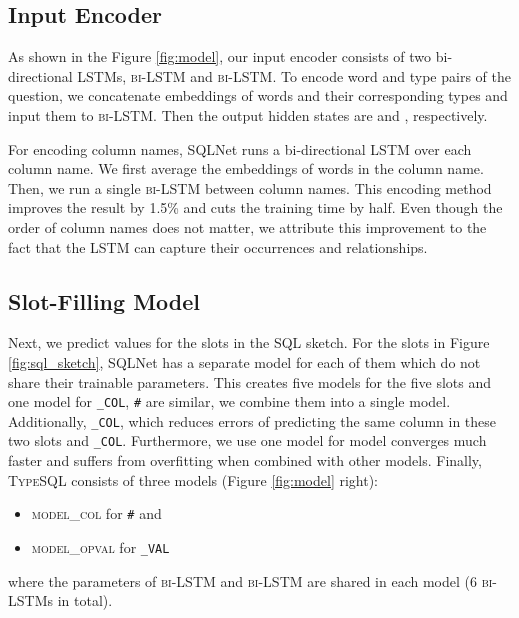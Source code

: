 \documentclass[11pt,a4paper]{article}
\begin{document}
{{\subsection{Input Encoder}
\label{sec:inputenc}

As shown in the Figure \ref{fig:model}, our input encoder consists of two bi-directional LSTMs, \textsc{bi-LSTM} and \textsc{bi-LSTM}. To encode word and type pairs of the question, we concatenate embeddings of words and their corresponding types and input them to \textsc{bi-LSTM}.
Then the output hidden states are  and , respectively.


For encoding column names, SQLNet runs a bi-directional LSTM over each column name. We first average the embeddings of words in the column name. Then, we run a single \textsc{bi-LSTM} between column names. This encoding method improves the result by 1.5\% and cuts the training time by half. Even though the order of column names does not matter, we attribute this improvement to the fact that the LSTM can capture their occurrences and relationships.

\subsection{Slot-Filling Model}
\label{sec:slot-filling}

Next, we predict values for the slots in the SQL sketch. For the slots in Figure \ref{fig:sql_sketch}, SQLNet has a separate model for each of them which do not share their trainable parameters. This creates five models for the five slots and one model for \texttt{\SELECT\_COL}, \texttt{\COND\#} are similar, we combine them into a single model. Additionally, \texttt{\SELECT\_COL}, which reduces errors of predicting the same column in these two slots \texttt{\OP} and \texttt{\COND\_COL}. Furthermore, we use one model for \texttt{\AGG} model converges much faster and suffers from overfitting when combined with other models.
Finally, \textsc{TypeSQL} consists of three models (Figure \ref{fig:model} right):
\begin{itemize}
    \item \textsc{model\_col} for \texttt{\COND\#} and \texttt{\AGG}
    \item \textsc{model\_opval} for \texttt{\COND\_VAL}
\end{itemize}
where the parameters of \textsc{bi-LSTM} and \textsc{bi-LSTM} are shared in each model (6 \textsc{bi-LSTM}s in total).



}}
\end{document}
